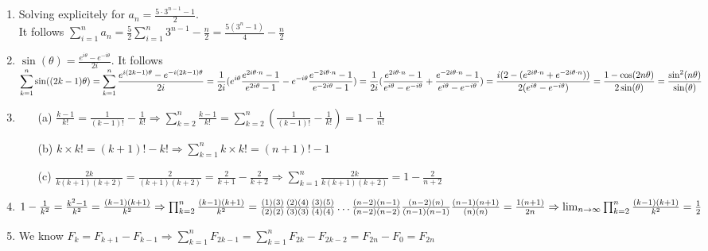 \documentclass[10pt]{article}
\begin{document}
\begin{enumerate}[label= (Q-\arabic*)]
\item Solving explicitely for $a_n=\frac{5\cdot 3^{n-1}-1}{2}$.\\ 
It follows $\displaystyle\sum_{i=1}^{n}a_n=\frac{5}{2}\sum_{i=1}^{n}3^{n-1}-\frac{n}{2}=\frac{5(3^n-1)}{4}-\frac{n}{2}$
\item $\sin(\theta)=\frac{e^{i\theta}-e^{-i\theta}}{2i}$. It follows $\displaystyle\sum_{k=1}^{n}\sin((2k-1)\theta)=\sum_{k=1}^{n}\frac{e^{i(2k-1)\theta}-e^{-i(2k-1)\theta}}{2i}\\
=\frac{1}{2i}(e^{i\theta}\frac{e^{2i\theta\cdot n}-1}{e^{2i\theta}-1}-e^{-i\theta}\frac{e^{-2i\theta\cdot n}-1}{e^{-2i\theta}-1})=\frac{1}{2i}(\frac{e^{2i\theta\cdot n}-1}{e^{i\theta}-e^{-i\theta}}+\frac{e^{-2i\theta\cdot n}-1}{e^{i\theta}-e^{-i\theta}})=\frac{i(2-(e^{2i\theta\cdot n}+e^{-2i\theta\cdot n}))}{2(e^{i\theta}-e^{-i\theta})}=\frac{1-\cos (2n\theta)}{2\sin(\theta)}=\frac{{\sin}^2(n\theta)}{\sin(\theta)}$
\item \begin{itemize}
    \item [(a)] $\frac{k-1}{k!}=\frac{1}{(k-1)!}-\frac{1}{k!}\Rightarrow\sum_{k=2}^{n}\frac{k-1}{k!}=\sum_{k=2}^{n}(\frac{1}{(k-1)!}-\frac{1}{k!})=1-\frac{1}{n!}$
    \item [(b)] $k\times k!=(k+1)!-k!\Rightarrow \sum_{k=1}^{n}k\times k!=(n+1)!-1$
    \item [(c)] $\frac{2k}{k(k+1)(k+2)}=\frac{2}{(k+1)(k+2)}=\frac{2}{k+1}-\frac{2}{k+2}\Rightarrow\sum_{k=1}^{n}\frac{2k}{k(k+1)(k+2)}=1-\frac{2}{n+2}$
\end{itemize}
\item $1-\frac{1}{k^2}=\frac{k^2-1}{k^2}=\frac{(k-1)(k+1)}{k^2}\Rightarrow\prod_{k=2}^{n}\frac{(k-1)(k+1)}{k^2}\\
=\frac{(1)(3)}{(2)(2)}\frac{(2)(4)}{(3)(3)}\frac{(3)(5)}{(4)(4)}\ldots\frac{(n-2)(n-1)}{(n-2)(n-2)}\frac{(n-2)(n)}{(n-1)(n-1)}\frac{(n-1)(n+1)}{(n)(n)}\\
=\frac{1(n+1)}{2n}\Rightarrow\lim_{n\rightarrow\infty}\prod_{k=2}^{n}\frac{(k-1)(k+1)}{k^2}=\frac{1}{2}$
\item We know $F_k=F_{k+1}-F_{k-1}\Rightarrow\sum_{k=1}^{n}F_{2k-1}=\sum_{k=1}^{n}F_{2k}-F_{2k-2}=F_{2n}-F_0=F_{2n}$
\end{enumerate}
\end{document}
